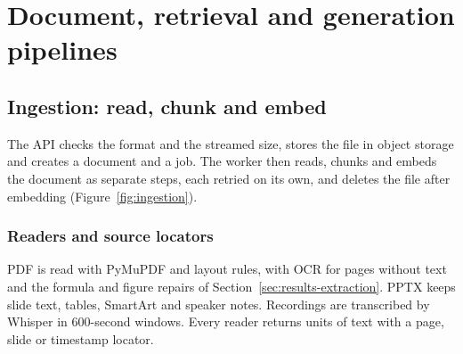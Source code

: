 \clearpage\section{Document, retrieval and generation pipelines}
\subsection{Ingestion: read, chunk and embed}
The API checks the format and the streamed size, stores the file in object storage and creates a document and a job. The worker then reads, chunks and embeds the document as separate steps, each retried on its own, and deletes the file after embedding (Figure~\ref{fig:ingestion}).
\subsubsection{Readers and source locators}
PDF is read with PyMuPDF and layout rules, with OCR for pages without text and the formula and figure repairs of Section~\ref{sec:results-extraction}. PPTX keeps slide text, tables, SmartArt and speaker notes. Recordings are transcribed by Whisper in 600-second windows. Every reader returns units of text with a page, slide or timestamp locator.
